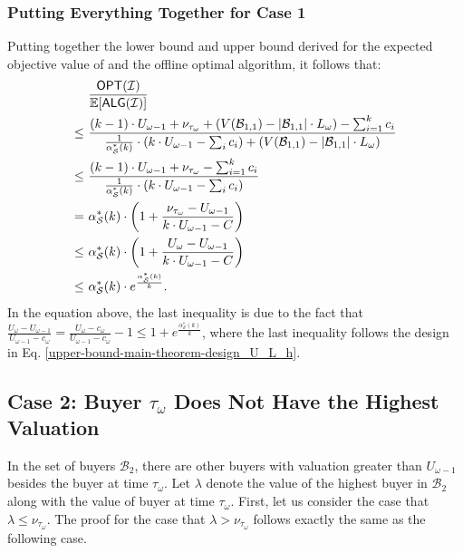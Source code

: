 \subsubsection{Putting Everything Together for Case 1}
Putting together the lower bound and upper bound derived for the expected objective value of \rDynamic and the offline optimal algorithm, it follows that:
\begin{align*}
   & \frac{\textsf{OPT}(\mathcal{I})}{ \mathbb{E}[\textsf{ALG}(\mathcal{I})]} \\
   \leq\ & \frac{(k-1) \cdot U_{\omega-1} + \nu_{\tau_{\omega}} + (V(\mathcal{B}_{1,1}) - |\mathcal{B}_{1,1}| \cdot L_{\omega} ) - \sum_{i=1}^{k} c_{i}}{\frac{1}{\alpha_{\mathcal{S}}^*(k)} \cdot (k \cdot U_{\omega-1} - \sum_{i} c_{i}) + (V(\mathcal{B}_{1,1}) - |\mathcal{B}_{1,1}| \cdot L_{\omega})} \\
    \leq\  & \frac{(k-1) \cdot U_{\omega-1} + \nu_{\tau_{\omega}} - \sum_{i=1}^{k} c_{i}}{\frac{1}{\alpha_{\mathcal{S}}^*(k)} \cdot \left(k \cdot U_{\omega-1} - \sum_{i} c_{i}\right)} \\
    =\ & \alpha_{\mathcal{S}}^*(k) \cdot \left(1+\frac{\nu_{\tau_{\omega}}-U_{\omega-1}}{k\cdot U_{\omega-1}-C}\right) \\
    \leq\ & \alpha_{\mathcal{S}}^*(k) \cdot \left(1+\frac{U_{\omega}-U_{\omega-1}}{k\cdot U_{\omega-1}-C}\right) \\
    \leq\ & \alpha_{\mathcal{S}}^*(k) \cdot e^{\frac{\alpha_{\mathcal{S}}^*(k)}{k}}.
\end{align*} 
In the equation above, the last inequality is due to the fact that $\frac{U_{\omega}-U_{\omega-1}}{U_{\omega-1} - c_{\omega}} = \frac{U_{\omega}-c_{\omega}}{U_{\omega-1} - c_{\omega}} - 1 \leq 1 + e^{\frac{\alpha_{\mathcal{S}}^*(k)}{k}}$, where the last inequality follows the design in Eq. \eqref{upper-bound-main-theorem-design_U_L_h}.


\subsection{Case 2: Buyer $ \tau_{\omega}$ Does Not Have the Highest Valuation}
In the set of buyers $\mathcal{B}_{2}$, there are other buyers with valuation greater than $U_{\omega-1}$ besides the buyer at time $\tau_{\omega}$.
Let $\lambda$ denote the value of the highest buyer in $\mathcal{B}_{2}$ along with the value of buyer at time $\tau_{\omega}$.
First, let us consider the case that $\lambda \leq \nu_{\tau_{\omega}}$. The proof for the case that $\lambda > \nu_{\tau_{\omega}}$ follows exactly the same as the following case.

